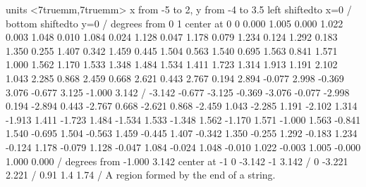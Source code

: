 \figure
\texonly
\vbox{\beginpicture
\normalgraphs
\sevenpoint
\setcoordinatesystem units <7truemm,7truemm>
\setplotarea x from -5 to 2, y from -4  to 3.5
\axis left shiftedto x=0 /
\axis bottom shiftedto y=0 /
 degrees from 0 1 center at 0 0
\setquadratic
\textRed
{} 0.000 1.005 0.000 1.022 0.003 1.048 0.010 1.084 0.024
1.128 0.047 1.178 0.079 1.234 0.124 1.292 0.183 1.350 0.255
1.407 0.342 1.459 0.445 1.504 0.563 1.540 0.695 1.563 0.841
1.571 1.000 1.562 1.170 1.533 1.348 1.484 1.534 1.411 1.723
1.314 1.913 1.191 2.102 1.043 2.285 0.868 2.459 0.668 2.621
0.443 2.767 0.194 2.894 -0.077 2.998 -0.369 3.076 -0.677 3.125
-1.000 3.142 /
 -3.142 -0.677 -3.125 -0.369 -3.076 -0.077 -2.998 0.194 -2.894
0.443 -2.767 0.668 -2.621 0.868 -2.459 1.043 -2.285 1.191 -2.102
1.314 -1.913 1.411 -1.723 1.484 -1.534 1.533 -1.348 1.562 -1.170
1.571 -1.000 1.563 -0.841 1.540 -0.695 1.504 -0.563 1.459 -0.445
1.407 -0.342 1.350 -0.255 1.292 -0.183 1.234 -0.124 1.178 -0.079
1.128 -0.047 1.084 -0.024 1.048 -0.010 1.022 -0.003 1.005 -0.000
1.000 0.000 /
 degrees from -1.000 3.142 center at -1 0
\textBlack
\setlinear\setdashes <2pt>
 -3.142 -1 3.142 /
 0 -3.221 2.221 /
 0.91 1.4 1.74 /
\endpicture}
\endtexonly
{}
\begincaption
A region formed by the end of a string.
\endcaption
\endfigure
\endexercise

\endexercises
